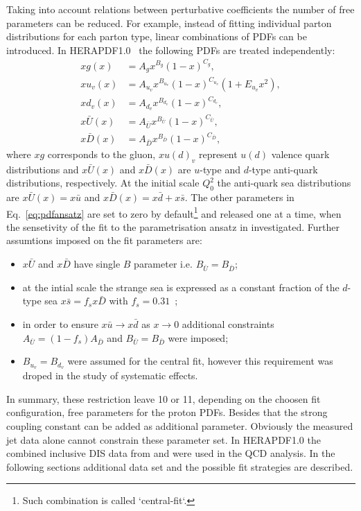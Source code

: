 Taking into account relations between perturbative coefficients the number of free parameters can be reduced. For example, instead of fitting individual parton distributions for each parton type, linear combinations of PDFs can be introduced.  In HERAPDF1.0~\cite{Aaron:2009aa} the following PDFs are treated independently:
\begin{align}
 xg\left(x\right) &= A_gx^{B_g}\left(1-x\right)^{C_g},\\
 xu_v\left(x\right) &= A_{u_v}x^{B_{u_v}}\left(1-x\right)^{C_{u_v}}\left(1+E_{u_v}x^2\right),\\
 xd_v\left(x\right) &= A_{d_v}x^{B_{d_v}}\left(1-x\right)^{C_{d_v}},\\
 x\bar{U}\left(x\right) &= A_{\bar{U}}x^{B_{\bar{U}}}\left(1-x\right)^{C_{\bar{U}}},\\
 x\bar{D}\left(x\right) &= A_{\bar{D}}x^{B_{\bar{D}}}\left(1-x\right)^{C_{\bar{D}}},
\end{align}
where $xg$ corresponds to the gluon, $xu\left(d\right)_v$ represent $u\left(d\right)$ valence quark distributions and $x\bar{U}\left(x\right)$ and $x\bar{D}\left(x\right)$ are $u$-type and $d$-type anti-quark distributions, respectively. At the initial scale $Q^2_0$ the anti-quark sea distributions are $x\bar{U}\left(x\right)=x\bar u$ and $x\bar{D}\left(x\right)=x\bar d+x\bar s$. The other parameters in Eq.~\eqref{eq:pdfansatz} are set to zero by default\footnote{Such combination is called `central-fit`.} and released one at a time, when the sensetivity of the fit to the parametrisation ansatz in investigated. Further assumtions imposed on the fit parameters are:
\begin{itemize}
 \item $x\bar{U}$ and $x\bar{D}$ have single $B$ parameter i.e. $B_{\bar{U}}=B_{\bar{D}}$;
 \item at the intial scale the strange sea is expressed as a constant fraction of the $d$-type sea $x\bar s=f_s x \bar D$ with $f_s=0.31$~\cite{Martin:2009iq,Nadolsky:2008zw};
 \item in order to ensure $x\bar u \rightarrow x\bar d$ as $x\rightarrow 0$ additional constraints $A_{\bar U}=\left(1-f_s\right)A_{\bar D}$ and $B_{\bar U}=B_{\bar D}$ were imposed;
 \item $B_{u_v}=B_{d_v}$ were assumed for the central fit, however this requirement was droped in the study of systematic effects.
\end{itemize}
In summary, these restriction leave 10 or 11, depending on the choosen fit configuration, free parameters for the proton PDFs. Besides that the strong coupling constant \asz can be added as additional parameter. Obviously the measured jet data alone cannot constrain these parameter set. In HERAPDF1.0 the combined inclusive DIS data from \hone and \zeus were used in the QCD analysis. In the following sections additional data set and the possible fit strategies are described.
